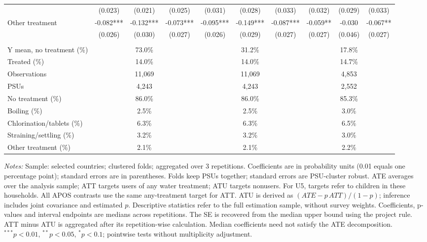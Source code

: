 \documentclass[10pt]{article}
\begin{document}
\begin{table}[H]
\begin{adjustbox}{max width=\linewidth}
\begin{tabular}{lccccccccc}
 & (0.023) & (0.021) & (0.025) & (0.031) & (0.028) & (0.033) & (0.032) & (0.029) & (0.033) \\
Other treatment & -0.082*** & -0.132*** & -0.073*** & -0.095*** & -0.149*** & -0.087*** & -0.059** & -0.030 & -0.067** \\
 & (0.026) & (0.030) & (0.027) & (0.026) & (0.029) & (0.027) & (0.027) & (0.046) & (0.027) \\
\addlinespace[6pt]
\multicolumn{10}{l}{\textit{Descriptive statistics and sample}} \\
Y mean, no treatment (\%) & \multicolumn{3}{c}{73.0\%} & \multicolumn{3}{c}{31.2\%} & \multicolumn{3}{c}{17.8\%} \\
Treated (\%) & \multicolumn{3}{c}{14.0\%} & \multicolumn{3}{c}{14.0\%} & \multicolumn{3}{c}{14.7\%} \\
Observations & \multicolumn{3}{c}{11,069} & \multicolumn{3}{c}{11,069} & \multicolumn{3}{c}{4,853} \\
PSUs & \multicolumn{3}{c}{4,243} & \multicolumn{3}{c}{4,243} & \multicolumn{3}{c}{2,552} \\
No treatment (\%) & \multicolumn{3}{c}{86.0\%} & \multicolumn{3}{c}{86.0\%} & \multicolumn{3}{c}{85.3\%} \\
Boiling (\%) & \multicolumn{3}{c}{2.5\%} & \multicolumn{3}{c}{2.5\%} & \multicolumn{3}{c}{3.0\%} \\
Chlorination/tablets (\%) & \multicolumn{3}{c}{6.3\%} & \multicolumn{3}{c}{6.3\%} & \multicolumn{3}{c}{6.5\%} \\
Straining/settling (\%) & \multicolumn{3}{c}{3.2\%} & \multicolumn{3}{c}{3.2\%} & \multicolumn{3}{c}{3.0\%} \\
Other treatment (\%) & \multicolumn{3}{c}{2.1\%} & \multicolumn{3}{c}{2.1\%} & \multicolumn{3}{c}{2.2\%} \\
\hline\hline
\end{tabular}
\end{adjustbox}
\par\vspace{3pt}
\begin{minipage}{\linewidth}\scriptsize \textit{Notes:} Sample: selected countries; clustered folds; aggregated over 3 repetitions. Coefficients are in probability units (0.01 equals one percentage point); standard errors are in parentheses. Folds keep PSUs together; standard errors are PSU-cluster robust. ATE averages over the analysis sample; ATT targets users of any water treatment; ATU targets nonusers. For U5, targets refer to children in these households. All APOS contrasts use the same any-treatment target for ATT. ATU is derived as $(ATE-p\,ATT)/(1-p)$; inference includes joint covariance and estimated $p$. Descriptive statistics refer to the full estimation sample, without survey weights. Coefficients, p-values and interval endpoints are medians across repetitions. The SE is recovered from the median upper bound using the project rule. ATT minus ATU is aggregated after its repetition-wise calculation. Median coefficients need not satisfy the ATE decomposition. $^{***}p<0.01$, $^{**}p<0.05$, $^{*}p<0.1$; pointwise tests without multiplicity adjustment.\end{minipage}
\end{table}
\end{document}

